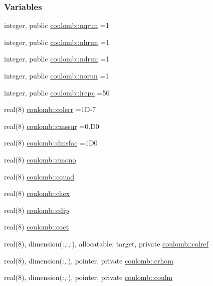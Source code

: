 \subsubsection*{Variables}
\begin{DoxyCompactItemize}
\item 
integer, public \hyperlink{namespacecoulomb_a8f87be32e0e3be0f5c0f72385849bba9}{coulomb\+::nqrun} =1
\item 
integer, public \hyperlink{namespacecoulomb_a0a85c519a9c3c83e58ad2fd8b41d63cd}{coulomb\+::nhrun} =1
\item 
integer, public \hyperlink{namespacecoulomb_a3a4d72dad873e26eea3e8489927259a8}{coulomb\+::ndrun} =1
\item 
integer, public \hyperlink{namespacecoulomb_ac85c91da1536ba35ab613b60649b2c8e}{coulomb\+::norun} =1
\item 
integer, public \hyperlink{namespacecoulomb_abbd920ad240f2299a64eb8a558453958}{coulomb\+::irepc} =50
\item 
real(8) \hyperlink{namespacecoulomb_ad503a40a54dbeb40ad5ba58cb265828e}{coulomb\+::colerr} =1\+D-\/7
\item 
real(8) \hyperlink{namespacecoulomb_a31931c26339890d5d66b1516a05a980a}{coulomb\+::cmssqr} =0.\+D0
\item 
real(8) \hyperlink{namespacecoulomb_aa59198776eee2c212c28eff84880b2bb}{coulomb\+::dmsfac} =1\+D0
\item 
real(8) \hyperlink{namespacecoulomb_aa87ca99119e06734684a442096f66a9f}{coulomb\+::cmono}
\item 
real(8) \hyperlink{namespacecoulomb_a450353dd0725d0adcfccde340eaec3fd}{coulomb\+::cquad}
\item 
real(8) \hyperlink{namespacecoulomb_ad110abadb05ffa8e3f56e113982107dd}{coulomb\+::chex}
\item 
real(8) \hyperlink{namespacecoulomb_a1f08c19f7be33ad2774d5604183d78ef}{coulomb\+::cdip}
\item 
real(8) \hyperlink{namespacecoulomb_ae7bc3b66c52d01cd2a966481a18edceb}{coulomb\+::coct}
\item 
real(8), dimension(\+:,\+:,\+:), allocatable, target, private \hyperlink{namespacecoulomb_ad6d5934252662a9fb13323943cd632cf}{coulomb\+::colref}
\item 
real(8), dimension(\+:,\+:), pointer, private \hyperlink{namespacecoulomb_aaace1db6c4f56843a8d8e0704b938705}{coulomb\+::crhom}
\item 
real(8), dimension(\+:,\+:), pointer, private \hyperlink{namespacecoulomb_ae7ca63e9c625e432df71f2f2bb337039}{coulomb\+::coulm}

\end{DoxyCompactItemize}
